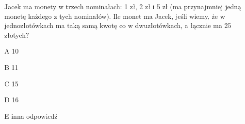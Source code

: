 \begin{tresc}
Jacek ma monety w trzech nominałach: 1 zł, 2 zł i 5 zł (ma przynajmniej jedną monetę każdego z tych nominałów). Ile monet ma Jacek, jeśli wiemy, że w jednozłotówkach ma taką samą kwotę co w dwuzłotówkach, a łącznie ma 25 złotych?
\end{tresc}
\begin{wariant}{A} 10 \end{wariant}
\begin{wariant}{B} 11 \end{wariant}
\begin{wariant}{C} 15 \end{wariant}
\begin{wariant}{D} 16 \end{wariant}
\begin{wariant}{E} inna odpowiedź \end{wariant}
